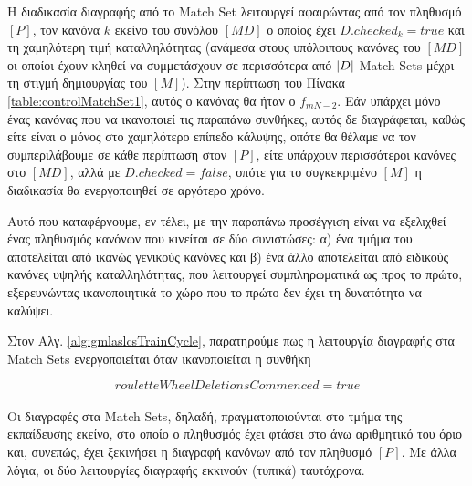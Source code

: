 Η διαδικασία διαγραφής από το Match Set λειτουργεί αφαιρώντας από τον πληθυσμό $[P]$, τον κανόνα $k$ εκείνο του συνόλου $[MD]$ ο οποίος έχει $D.checked_{k}=true$ και τη χαμηλότερη τιμή καταλληλότητας (ανάμεσα στους υπόλοιπους κανόνες του $[MD]$ οι οποίοι έχουν κληθεί να συμμετάσχουν σε περισσότερα από $\lvert D\rvert$ Match Sets μέχρι τη στιγμή δημιουργίας του $[M]$). Στην περίπτωση του Πίνακα \ref{table:controlMatchSet1}, αυτός ο κανόνας θα ήταν ο $f_{mN-2}$. Εάν υπάρχει μόνο ένας κανόνας που να ικανοποιεί τις παραπάνω συνθήκες, αυτός δε διαγράφεται, καθώς είτε είναι ο μόνος στο χαμηλότερο επίπεδο κάλυψης, οπότε θα θέλαμε να τον συμπεριλάβουμε σε κάθε περίπτωση στον $[P]$, είτε υπάρχουν περισσότεροι κανόνες στο $[MD]$, αλλά με $D.checked=false$, οπότε για το συγκεκριμένο $[M]$ η διαδικασία θα ενεργοποιηθεί σε αργότερο χρόνο.


Αυτό που καταφέρνουμε, εν τέλει, με την παραπάνω προσέγγιση είναι να εξελιχθεί ένας πληθυσμός κανόνων που κινείται σε δύο συνιστώσες: α) ένα τμήμα του αποτελείται από ικανώς γενικούς κανόνες και β) ένα άλλο αποτελείται από ειδικούς κανόνες υψηλής καταλληλότητας, που λειτουργεί συμπληρωματικά ως προς το πρώτο, εξερευνώντας ικανοποιητικά το χώρο που το πρώτο δεν έχει τη δυνατότητα να καλύψει. 

Στον Αλγ. \ref{alg:gmlaslcsTrainCycle}, παρατηρούμε πως η λειτουργία διαγραφής στα Match Sets ενεργοποιείται όταν ικανοποιείται η συνθήκη

\begin{equation}
rouletteWheelDeletionsCommenced = true
\end{equation}
\\
Οι διαγραφές στα Match Sets, δηλαδή, πραγματοποιούνται στο τμήμα της εκπαίδευσης εκείνο, στο οποίο ο πληθυσμός έχει φτάσει στο άνω αριθμητικό του όριο και, συνεπώς, έχει ξεκινήσει η διαγραφή κανόνων από τον πληθυσμό $[P]$. Με άλλα λόγια, οι δύο λειτουργίες διαγραφής εκκινούν (τυπικά) ταυτόχρονα. 

